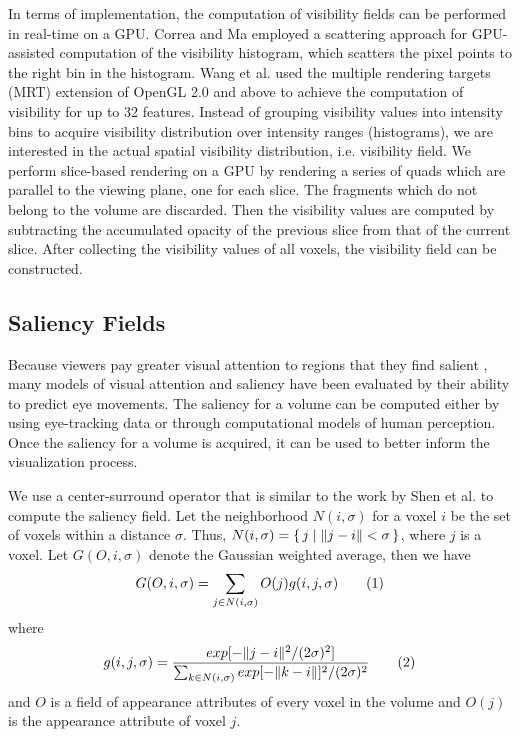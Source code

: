 In terms of implementation, the computation of visibility fields can be performed in real-time on a GPU.
Correa and Ma \cite{correa_visibility_2011} employed a scattering approach for GPU-assisted computation of the visibility histogram, which scatters the pixel points to the right bin in the histogram. Wang et al. \cite{wang_efficient_2011} used the multiple rendering targets (MRT) extension of OpenGL 2.0 and above to achieve the computation of visibility for up to 32 features.
Instead of grouping visibility values into intensity bins to acquire visibility distribution over intensity ranges (histograms), we are interested in the actual spatial visibility distribution, i.e. visibility field. We perform slice-based rendering on a GPU by rendering a series of quads which are parallel to the viewing plane, one for each slice. The fragments which do not belong to the volume are discarded. Then the visibility values are computed by subtracting the accumulated opacity of the previous slice from that of the current slice. After collecting the visibility values of all voxels, the visibility field can be constructed.

\subsection{Saliency Fields \label{saliency_fields}}
Because viewers pay greater visual attention to regions that they find salient \cite{palmer_vision_1999}, many models of visual attention and saliency have been evaluated by their ability to predict eye movements. The saliency for a volume can be computed either by using eye-tracking data or through computational models of human perception. Once the saliency for a volume is acquired, it can be used to better inform the visualization process.

We use a center-surround operator that is similar to the work by Shen et al. \cite{shen_spatiotemporal_2015} to compute the saliency field.
Let the neighborhood $ N(i,\sigma) $ for a voxel $ i $ be the set of voxels within a distance $ \sigma $. Thus, $ N(i,\sigma)=\set{j|\|j-i\|<\sigma} $, where $ j $ is a voxel. Let $ G(O,i,\sigma) $ denote the Gaussian weighted average, then we have
\[ G(O,i,\sigma)=\sum_{j \in N(i,\sigma)} O(j) g(i,j,\sigma)
\addtag \]
where
\[ g(i,j,\sigma)=\frac{exp[-\|j-i\|^{2}/(2\sigma)^{2}]}{\sum_{k\in N(i,\sigma)} exp[-\|k-i\|]^{2}/(2\sigma)^{2}}
\addtag \]
and $ O $ is a field of appearance attributes of every voxel in the volume and $ O(j) $ is the appearance attribute of voxel $ j $.

